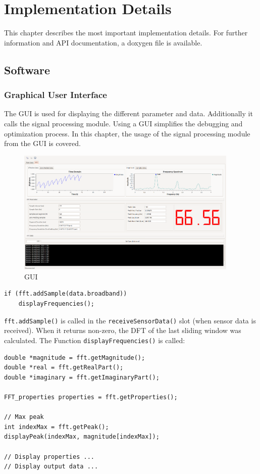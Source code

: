 \documentclass[notitlepage]{scrreprt}
\begin{document}
\chapter{Implementation Details}
\label{chap:impl-details}
This chapter describes the most important implementation details. For further information and API documentation, a doxygen file is available.

\section{Software}
\subsection{Graphical User Interface}
The GUI is used for displaying the different parameter and data. Additionally it calls the signal processing module. Using a GUI simplifies the debugging and optimization process. In this chapter, the usage of the signal processing module from the GUI is covered.

\begin{figure}[H]
	\centering
	\includegraphics[width=400px]{images/screen2.png}
	\caption{GUI}
	\label{fig:gui}
\end{figure}

\begin{lstlisting}[caption=MainWindow.cpp]
if (fft.addSample(data.broadband))
	displayFrequencies();
\end{lstlisting}

\lstinline{fft.addSample()} is called in the \lstinline{receiveSensorData()} slot (when sensor data is received). When it returns non-zero, the DFT of the last sliding window was calculated. The Function \lstinline{displayFrequencies()} is called:

\begin{lstlisting}[caption=MainWindow.cpp]
double *magnitude = fft.getMagnitude();
double *real = fft.getRealPart();
double *imaginary = fft.getImaginaryPart();

FFT_properties properties = fft.getProperties();

// Max peak
int indexMax = fft.getPeak();
displayPeak(indexMax, magnitude[indexMax]);

// Display properties ...
// Display output data ...
\end{lstlisting}
\end{document}
